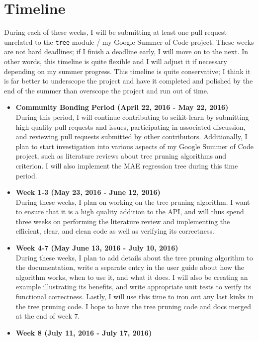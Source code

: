 \documentclass[12pt, oneside]{article}
\begin{document}
\section{Timeline}
During each of these weeks, I will be submitting at least one pull
request unrelated to the \texttt{tree} module / my Google Summer of Code project. These
weeks are not hard deadlines; if I finish a deadline early, I will
move on to the next. In other words, this timeline is quite flexible
and I will adjust it if necessary depending on my summer
progress. This timeline is quite conservative; I think it is far
better to underscope the project and have it completed and polished by
the end of the summer than overscope the project and run out of time.
\begin{itemize}
  \item 
  \textbf{Community Bonding Period (April 22, 2016 - May 22,
    2016)}\\
  During this period, I will continue contributing to
  scikit-learn by submitting high quality pull requests and issues,
  participating in associated discussion, and reviewing pull requests
  submitted by other contributors. Additionally, I plan to start
  investigation into various aspects of my Google Summer of Code
  project, such as literature reviews about tree pruning algorithms
  and criterion. I will also implement the MAE regression tree during
  this time period.
  \item
  \textbf{Week 1-3 (May 23, 2016 - June 12, 2016)}\\
  During these weeks, I plan on working on the tree pruning
  algorithm. I want to ensure that it is a high quality addition to
  the API, and will thus spend three weeks on performing the
  literature review and implementing the efficient, clear, and clean
  code as well as verifying its correctness.
  \item
  \textbf{Week 4-7 (May June 13, 2016 - July 10, 2016)}\\
  During these weeks, I plan to add details about the tree
  pruning algorithm to the documentation, write a separate entry in
  the user guide about how the algorithm works, when to use it, and
  what it does. I will also be creating an example illustrating its
  benefits, and write appropriate unit tests to verify its functional
  correctness. Lastly, I will use this time to iron out any last kinks
  in the tree pruning code. I hope to have the tree pruning code and
  docs merged at the end of week 7.
  \item
  \textbf{Week 8 (July 11, 2016 - July 17, 2016)}\\

\end{itemize}
\end{document}
